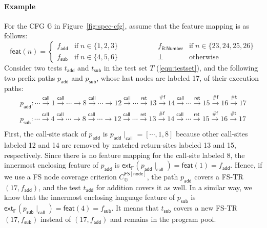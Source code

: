 \documentclass[acmsmall,review,screen]{acmart}
\newcommand{\tif}{\text{if} \; }
\newcommand{\telse}{\text{otherwise}}
\newcommand{\name}[1]{\textsf{#1}}
\newcommand{\graph}{\mathbb{G}}
\newcommand{\node}{n}
\newcommand{\edge}[1]{\xrightarrow{#1}}
\newcommand{\call}{\edge{\name{call}}}
\newcommand{\ret}{\edge{\name{ret}}}
\newcommand{\tedge}{\edge{\name{\#t}}}
\newcommand{\fedge}{\edge{\name{\#f}}}
\newcommand{\pat}{p}
\newcommand{\addpat}{\pat_\name{add}}
\newcommand{\subpat}{\pat_\name{sub}}
\newcommand{\test}{t}
\newcommand{\addtest}{\test_\name{add}}
\newcommand{\subtest}{\test_\name{sub}}
\newcommand{\cov}[1]{C_{#1}}
\newcommand{\featset}{\mathbb{F}}
\newcommand{\feat}{f}
\newcommand{\addfeat}{\feat_{\name{add}}}
\newcommand{\subfeat}{\feat_{\name{sub}}}
\newcommand{\numfeat}{\feat_{\name{B:Number}}}
\newcommand{\featmap}{\name{feat}}
\newcommand{\extfeat}{\name{ext}_\featset}
\newcommand{\css}[1]{{#1}\!\mid_{\name{call}}}
\newcommand{\fnodecov}[1]{\cov{#1}^{\name{FS}[\name{node}]}}
\begin{document}
\paragraph{\textbf{Example}}
%
For the CFG $\graph$ in Figure~\ref{fig:spec-cfg}, assume that the feature
mapping is as follows:
\begin{equation}\label{equ:featmap}
  \featmap(\node) = \left\{
    \begin{array}{lllll}
      \addfeat & \tif \node \in \{ 1, 2, 3\} &\qquad\qquad&
      \numfeat & \tif \node \in \{ 23, 24, 25, 26 \} \\

      \subfeat & \tif \node \in \{ 4, 5, 6\} &&
      \bot & \telse
    \end{array}
  \right.
\end{equation}
%
Consider two tests $\addtest$ and $\subtest$ in the test set $T$
(\ref{equ:testset}), and the following two prefix paths $\addpat$ and $\subpat$,
whose last nodes are labeled 17, of their execution paths:
%
\[
  \begin{array}{l}
    \addpat: \cdots \call 1 \call \cdots \edge{} 8 \call \cdots \edge{} 12 \call
    \cdots \ret 13 \fedge 14 \call \cdots \ret 15 \fedge 16 \tedge 17\\

    \subpat:\cdots \call 4 \call \cdots \edge{} 8 \call \cdots \edge{} 12 \call
    \cdots \ret 13 \fedge 14 \call \cdots \ret 15 \fedge 16 \tedge 17\\
  \end{array}
\]
%
First, the call-site stack of $\addpat$ is $\css{\addpat} = [\cdots, 1, 8]$
because other call-sites labeled 12 and 14 are removed by matched return-sites
labeled 13 and 15, respectively.
%
Since there is no feature mapping for the call-site labeled 8, the innermost enclosing
feature of $\addpat$ is $\extfeat(\css{\addpat}) = \featmap(1) =
\addfeat$.
%
Hence, if we use a FS node coverage criterion $\fnodecov{\graph}$, the path
$\addpat$ covers a FS-TR $(17, \addfeat)$, and the test $\addtest$ for addition
covers it as well.
%
In a similar way, we know that the innermost enclosing language feature of $\subpat$
is $\extfeat(\css{\subpat}) = \featmap(4) = \subfeat$.
%
It means that $\subtest$ covers a new FS-TR $(17, \subfeat)$ instead of $(17,
\addfeat)$ and remains in the program pool.

\end{document}
